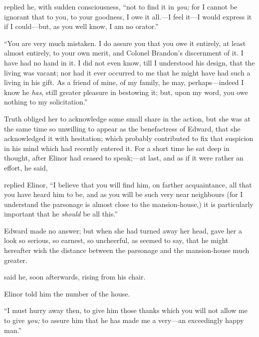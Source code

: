 
 replied he, with sudden consciousness, “not to find it in {\em you;} for I cannot be ignorant that to you, to your goodness, I owe it all.---I feel it---I would express it if I could---but, as you well know, I am no orator.”

“You are very much mistaken. I do assure you that you owe it entirely, at least almost entirely, to your own merit, and Colonel Brandon's discernment of it. I have had no hand in it. I did not even know, till I understood his design, that the living was vacant; nor had it ever occurred to me that he might have had such a living in his gift. As a friend of mine, of my family, he may, perhaps---indeed I know he {\em has}, still greater pleasure in bestowing it; but, upon my word, you owe nothing to my solicitation.”

Truth obliged her to acknowledge some small share in the action, but she was at the same time so unwilling to appear as the benefactress of Edward, that she acknowledged it with hesitation; which probably contributed to fix that suspicion in his mind which had recently entered it. For a short time he sat deep in thought, after Elinor had ceased to speak;---at last, and as if it were rather an effort, he said,


 replied Elinor, “I believe that you will find him, on farther acquaintance, all that you have heard him to be, and as you will be such very near neighbours (for I understand the parsonage is almost close to the mansion-house,) it is particularly important that he {\em should} be all this.”

Edward made no answer; but when she had turned away her head, gave her a look so serious, so earnest, so uncheerful, as seemed to say, that he might hereafter wish the distance between the parsonage and the mansion-house much greater.

 said he, soon afterwards, rising from his chair.

Elinor told him the number of the house.

“I must hurry away then, to give him those thanks which you will not allow me to give {\em you;} to assure him that he has made me a very---an exceedingly happy man.”

